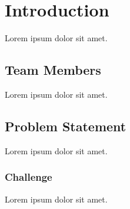 \chapter{Introduction}
Lorem ipsum dolor sit amet.

\section{Team Members}
Lorem ipsum dolor sit amet.

\section{Problem Statement}
Lorem ipsum dolor sit amet.

\subsection{Challenge}
Lorem ipsum dolor sit amet.
